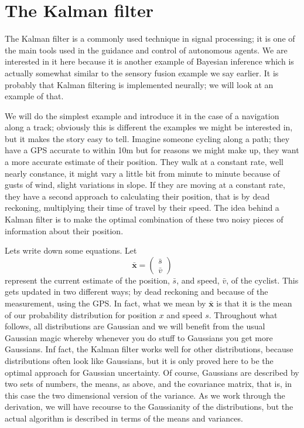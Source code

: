 \documentclass[12pt]{article}
\begin{document}
\section*{The Kalman filter}

The Kalman filter is a commonly used technique in signal processing;
it is one of the main tools used in the guidance and control of
autonomous agents. We are interested in it here because it is another
example of Bayesian inference which is actually somewhat similar to
the sensory fusion example we say earlier. It is probably that Kalman
filtering is implemented neurally; we will look at an example of that.

We will do the simplest example and introduce it in the case of a
navigation along a track; obviously this is different the examples we
might be interested in, but it makes the story easy to tell. Imagine
someone cycling along a path; they have a GPS accurate to within 10m
but for reasons we might make up, they want a more accurate estimate
of their position. They walk at a constant rate, well nearly
constance, it might vary a little bit from minute to minute because of
gusts of wind, slight variations in slope. If they are moving at a
constant rate, they have a second approach to calculating their
position, that is by dead reckoning, multiplying their time of travel
by their speed. The idea behind a Kalman filter is to make the optimal
combination of these two noisy pieces of information about their
position.

Lets write down some equations. Let 
\begin{equation}
\mathbf{\bar{x}}=\left(\begin{array}{c}\bar{s}\\\bar{v}\end{array}\right)
\end{equation}
represent the current estimate of the position, $\bar{s}$, and speed,
$\bar{v}$, of the cyclist. This gets updated in two different ways; by
dead reckoning and because of the measurement, using the GPS. In fact,
what we mean by $\mathbf{\bar{x}}$ is that it is the mean of our
probability distribution for position $x$ and speed $s$. Throughout
what follows, all distributions are Gaussian and we will benefit from
the usual Gaussian magic whereby whenever you do stuff to Gaussians
you get more Gaussians. Inf fact, the Kalman filter works well for
other distributions, because distributions often look like Gaussians,
but it is only proved here to be the optimal approach for Gaussian
uncertainty. Of course, Gaussians are described by two sets of
numbers, the means, as above, and the covariance matrix, that is, in
this case the two dimensional version of the variance. As we work
through the derivation, we will have recourse to the Gaussianity of
the distributions, but the actual algorithm is described in terms of
the means and variances.
\end{document}
